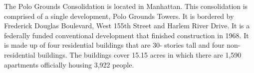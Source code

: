      

   

The Polo Grounds Consolidation is located in Manhattan. This consolidation is comprised of a single development, Polo Grounds Towers. It is bordered by Frederick Douglas Boulevard, West 155th Street and Harlem River Drive. It is a federally funded conventional development that finished construction in 1968. It is made up of four residential buildings that are 30- stories tall and four non-residential buildings. The buildings cover 15.15 acres in which there are 1,590 apartments officially housing 3,922 people. 